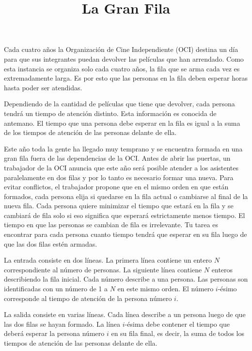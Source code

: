 \documentclass{oci}
\title{La Gran Fila}
\begin{document}
\maketitle

Cada cuatro años la Organización de Cine Independiente (OCI) destina un día para que sus integrantes puedan devolver las películas que han arrendado.
Como esta instancia se organiza solo cada cuatro años, la fila que se arma cada vez es extremadamente larga.
Es por esto que las personas en la fila deben esperar horas hasta poder ser atendidas.

Dependiendo de la cantidad de películas que tiene que devolver, cada persona tendrá un tiempo de atención distinto.
Esta información es conocida de antemano.
El tiempo que una persona debe esperar en la fila es igual a la suma de los tiempos de atención de las personas delante de ella.

Este año toda la gente ha llegado muy temprano y se encuentra formada en una gran fila fuera de las dependencias de la OCI.
Antes de abrir las puertas, un trabajador de la OCI anuncia que este año será posible atender a los asistentes paralelamente en dos filas y por lo tanto es necesario formar una nueva.
Para evitar conflictos, el trabajador propone que en el mismo orden en que están formados, cada persona elija si quedarse en la fila actual o cambiarse al final de la nueva fila.
Cada persona quiere minimizar el tiempo que estará en la fila y se cambiará de fila solo si eso significa que esperará estrictamente menos tiempo.
El tiempo en que las personas se cambian de fila es irrelevante.
Tu tarea es encontrar para cada persona cuanto tiempo tendrá que esperar en su fila luego de que las dos filas estén armadas.

\begin{inputDescription}
  La entrada consiste en dos líneas.
La primera línea contiene un entero $N$ correspondiente al número de personas.
La siguiente línea contiene $N$ enteros describiendo la fila inicial.
Cada número describe a una persona.
Las personas son identificadas con un número de 1 a $N$ en este mismo orden.
El número $i$-ésimo corresponde al tiempo de atención de la persona número $i$.
\end{inputDescription}

\begin{outputDescription}
  La salida consiste en varias líneas.
  Cada línea describe a un persona luego de que las dos filas se hayan formado.
  La línea $i$-ésima debe contener el tiempo que deberá esperar la persona número $i$ en su fila final, es decir, la suma de todos los tiempos de atención de las personas delante de ella.
\end{outputDescription}
\end{document}
